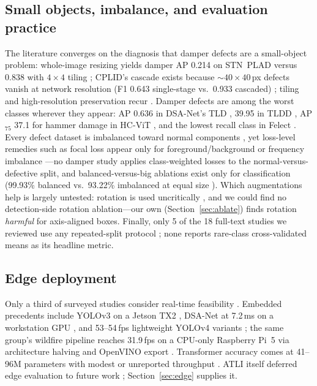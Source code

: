 \documentclass[conference]{IEEEtran}
\begin{document}
\subsection{Small objects, imbalance, and evaluation practice}
The literature converges on the diagnosis that damper defects are a small-object problem: whole-image resizing yields damper AP 0.214 on STN~PLAD versus 0.838 with $4\times4$ tiling \cite{vieiraesilva2021stnplad}; CPLID's cascade exists because ${\sim}40{\times}40$\,px defects vanish at network resolution (F1 0.643 single-stage vs.\ 0.933 cascaded) \cite{tao2020insulator}; tiling and high-resolution preservation recur \cite{yuan2023yolov5tl,wen2021insulator}. Damper defects are among the worst classes wherever they appear: AP 0.636 in DSA-Net's TLD \cite{zhang2024dsanet}, 39.95 in TLDD \cite{su2024cessd}, AP$_{75}$ 37.1 for hammer damage in HC-ViT \cite{zhang2024hcvit}, and the lowest recall class in Felect \cite{maduako2022felect}. Every defect dataset is imbalanced toward normal components \cite{tsai2025atli,bao2022bcyolo,zhang2024dsanet,zhang2023padetr,shakiba2022insulator}, yet loss-level remedies such as focal loss \cite{lin2017focal} appear only for foreground/background or frequency imbalance \cite{shuang2023rsin,maduako2022felect,li2020birdnestuav}---no damper study applies class-weighted losses to the normal-versus-defective split, and balanced-versus-big ablations exist only for classification (99.93\% balanced vs.\ 93.22\% imbalanced at equal size \cite{shakiba2022insulator}). Which augmentations help is largely untested: rotation is used uncritically \cite{bao2022bcyolo,maduako2022felect,sadykova2020inyolo}, and we could find no detection-side rotation ablation---our own (Section~\ref{sec:ablate}) finds rotation \emph{harmful} for axis-aligned boxes. Finally, only 5 of the 18 full-text studies we reviewed use any repeated-split protocol \cite{zhang2024dsanet,zhang2024slyolov8,vieiraesilva2021stnplad,vazquez2025wildfire,ling2019selfblast}; none reports rare-class cross-validated means as its headline metric.

\subsection{Edge deployment}
Only a third of surveyed studies consider real-time feasibility \cite{faisal2025powerline}. Embedded precedents include YOLOv3 on a Jetson TX2 \cite{siddiqui2020drone}, DSA-Net at 7.2\,ms on a workstation GPU \cite{zhang2024dsanet}, and 53--54\,fps lightweight YOLOv4 variants \cite{qiu2022lightweightyolov4,shuang2023rsin}; the same group's wildfire pipeline reaches 31.9\,fps on a CPU-only Raspberry Pi~5 via architecture halving and OpenVINO export \cite{vazquez2026wildfire}. Transformer accuracy comes at 41--96M parameters with modest or unreported throughput \cite{zhang2023padetr,zhang2024hcvit}. ATLI itself deferred edge evaluation to future work \cite{tsai2025atli}; Section~\ref{sec:edge} supplies it.
\end{document}
